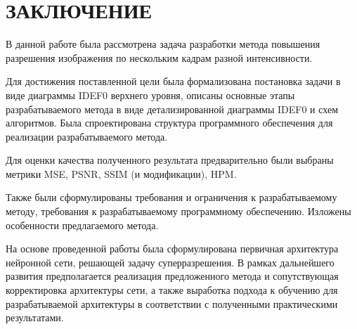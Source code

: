 \chapter*{ЗАКЛЮЧЕНИЕ}

В данной работе была рассмотрена задача разработки метода повышения разрешения изображения по нескольким кадрам разной интенсивности.

Для достижения поставленной цели была формализована постановка задачи в виде диаграммы IDEF0 верхнего уровня, описаны основные этапы разрабатываемого метода в виде детализированной диаграммы IDEF0 и схем алгоритмов. Была спроектирована структура программного обеспечения для реализации разрабатываемого метода. 

Для оценки качества полученного результата предварительно были выбраны метрики MSE, PSNR, SSIM (и модификации), HPM.

Также были сформулированы требования и ограничения к разрабатываемому методу, требования к разрабатываемому программному обеспечению. Изложены особенности предлагаемого метода.

На основе проведенной работы была сформулирована первичная архитектура нейронной сети, решающей задачу суперразрешения. В рамках дальнейшего развития предполагается реализация предложенного метода и сопутствующая корректировка архитектуры сети, а также выработка подхода к обучению для разрабатываемой архитектуры в соответствии с полученными практическими результатами.